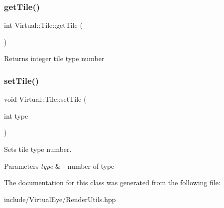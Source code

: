 \subsubsection{\texorpdfstring{get\+Tile()}{getTile()}}
{\footnotesize\ttfamily int Virtual\+::\+Tile\+::get\+Tile (\begin{DoxyParamCaption}{ }\end{DoxyParamCaption})}

\begin{DoxyReturn}{Returns}
integer tile type number 
\end{DoxyReturn}
\hypertarget{class_virtual_1_1_tile_a7e275a90e1b528130445c8e053d4dc66}{}\label{class_virtual_1_1_tile_a7e275a90e1b528130445c8e053d4dc66} 
\subsubsection{\texorpdfstring{set\+Tile()}{setTile()}}
{\footnotesize\ttfamily void Virtual\+::\+Tile\+::set\+Tile (\begin{DoxyParamCaption}\item[{int}]{type }\end{DoxyParamCaption})}



Sets tile type number. 


\begin{DoxyParams}{Parameters}
{\em type} & -\/ number of type \\
\hline
\end{DoxyParams}


The documentation for this class was generated from the following file\+:\begin{DoxyCompactItemize}
\item 
include/\+Virtual\+Eye/Render\+Utils.\+hpp\end{DoxyCompactItemize}
